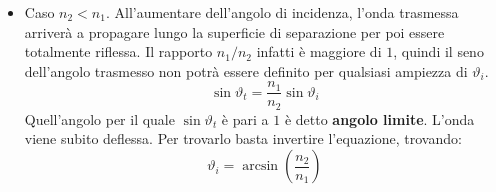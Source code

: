 \begin{itemize}
\begin{figure}[htpb]
	\end{figure}
	\FloatBarrier

	\item Caso $n_2<n_1$. All'aumentare dell'angolo di incidenza, l'onda trasmessa arriverà a propagare lungo la superficie di separazione per poi essere totalmente riflessa. Il rapporto $n_1/n_2$ infatti è maggiore di $1$, quindi il seno dell'angolo trasmesso non potrà essere definito per qualsiasi ampiezza di $ \vartheta_i  $.
	\[
		\sin \vartheta_t = \frac{n_1}{n_2}\sin \vartheta_i
	\]
	Quell'angolo per il quale $\sin \vartheta_t $ è pari a $1$ è detto \textbf{angolo limite}. L'onda viene subito deflessa. Per trovarlo basta invertire l'equazione, trovando:
	\[
		\vartheta_i = \arcsin \left( \frac{n_2}{n_1} \right)
	\]
	\begin{figure}[htpb]
		\centering
		


		\begin{tikzpicture}[x=0.75pt,y=0.75pt,yscale=-1,xscale=1]


\end{tikzpicture}
\end{figure}
\end{itemize}
